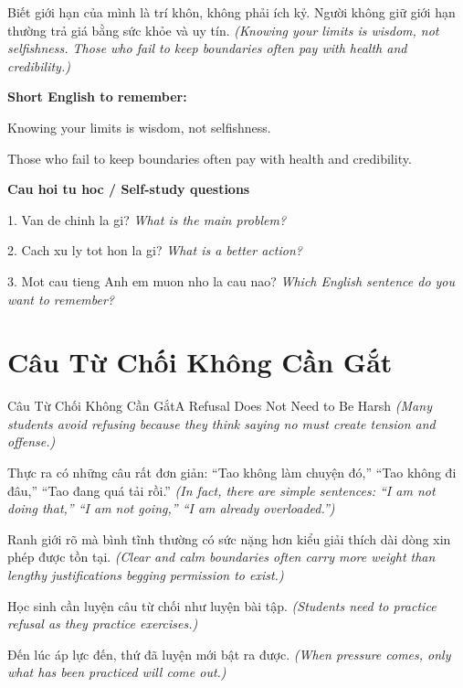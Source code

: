 \begin{baihoc}
Biết giới hạn của mình là trí khôn, không phải ích kỷ. Người không giữ giới hạn thường trả giá bằng sức khỏe và uy tín.
\textit{(Knowing your limits is wisdom, not selfishness. Those who fail to keep boundaries often pay with health and credibility.)}
\end{baihoc}

\begin{ghinhoanh}
\textbf{Short English to remember:}

Knowing your limits is wisdom, not selfishness.

Those who fail to keep boundaries often pay with health and credibility.

\end{ghinhoanh}

\begin{tuhocnhanh}
\textbf{Cau hoi tu hoc / Self-study questions}

1. Van de chinh la gi? \textit{What is the main problem?}

2. Cach xu ly tot hon la gi? \textit{What is a better action?}

3. Mot cau tieng Anh em muon nho la cau nao? \textit{Which English sentence do you want to remember?}
\end{tuhocnhanh}
\ngancach

\section{Câu Từ Chối Không Cần Gắt}
\begin{truyen}{Câu Từ Chối Không Cần Gắt}{A Refusal Does Not Need to Be Harsh}
\textit{(Many students avoid refusing because they think saying no must create tension and offense.)}

Thực ra có những câu rất đơn giản: ``Tao không làm chuyện đó,'' ``Tao không đi đâu,'' ``Tao đang quá tải rồi.''
\textit{(In fact, there are simple sentences: ``I am not doing that,'' ``I am not going,'' ``I am already overloaded.'')}

Ranh giới rõ mà bình tĩnh thường có sức nặng hơn kiểu giải thích dài dòng xin phép được tồn tại.
\textit{(Clear and calm boundaries often carry more weight than lengthy justifications begging permission to exist.)}

Học sinh cần luyện câu từ chối như luyện bài tập.
\textit{(Students need to practice refusal as they practice exercises.)}

Đến lúc áp lực đến, thứ đã luyện mới bật ra được.
\textit{(When pressure comes, only what has been practiced will come out.)}

\end{truyen}

